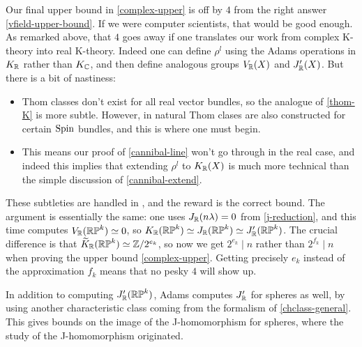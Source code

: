 \begin{remark}
  Our final upper bound in \eqref{complex-upper} is off by $4$ from the
  right answer \eqref{vfield-upper-bound}. If we were computer
  scientists, that would be good enough. As remarked above, that $4$
  goes away if one translates our work from complex K-theory into real
  K-theory. Indeed one can define $\rho^l$ using the Adams operations
  in $K_{\mathbb{R}}$ rather than $K_{\mathbb{C}}$, and then define analogous groups
  $V_{\mathbb{R}}(X)$ and $J'_{\mathbb{R}}(X)$. But there is a bit of nastiness:
  \begin{itemize}
  \item Thom classes don't exist for all real vector bundles, so the
    analogue of \eqref{thom-K} is more subtle. However, in
    \cite{abs-clifford} natural Thom clases are also constructed for
    certain $\mathrm{Spin}$ bundles, and this is where one must begin.
  \item This means our proof of \eqref{cannibal-line} won't go through
    in the real case, and indeed this implies that extending $\rho^l$
    to $K_{\mathbb{R}}(X)$ is much more technical than the simple discussion of
    \eqref{cannibal-extend}.
  \end{itemize}
  These subtleties are handled in \cite{adams-J-II}, and the reward is
  the correct bound. The argument is essentially the same: one uses
  $J_{\mathbb{R}}(n\lambda) = 0$ from \eqref{j-reduction}, and this time computes
  $V_{\mathbb{R}}(\mathbb{RP}^k) \simeq 0$, so $K_{\mathbb{R}}(\mathbb{RP}^k) \simeq J_{\mathbb{R}}(\mathbb{RP}^k) \simeq
  J_{\mathbb{R}}'(\mathbb{RP}^k)$. The crucial difference is that $\widetilde K_{\mathbb{R}}(\mathbb{RP}^k)
  \simeq \mathbb{Z}/2^{e_k}$, so now we get $2^{e_k} \mid n$ rather than
  $2^{f_k} \mid n$ when proving the upper bound
  \eqref{complex-upper}. Getting precisely $e_k$ instead of the
  approximation $f_k$ means that no pesky $4$ will show up.
\end{remark}

\begin{remark}
  In addition to computing $J_{\mathbb{R}}'(\mathbb{RP}^k)$, Adams computes $J_{\mathbb{R}}'$
  for spheres as well, by using another characteristic class coming
  from the formalism of \eqref{chclass-general}. This gives bounds on
  the image of the J-homomorphism for spheres, where the study of the
  J-homomorphism originated.
\end{remark}


\nocite{mathew-J, shah-vfields}




